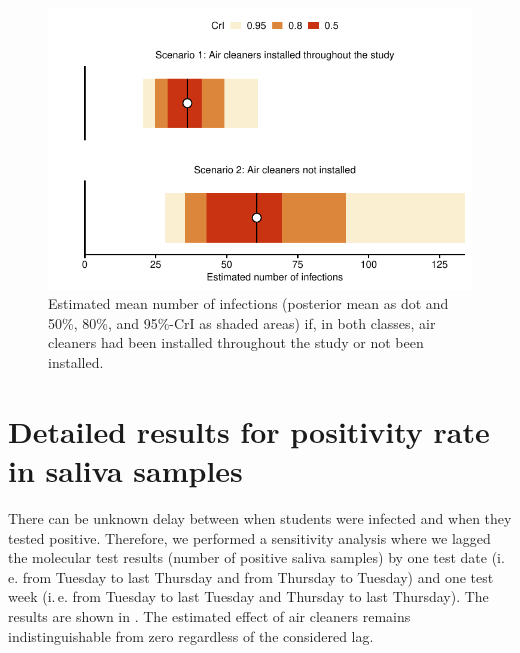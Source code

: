 \documentclass[fleqn,11pt]{wlscirep_supp}
\newcommand\ie{i.\,e.\xspace}
\begin{document}
\begin{figure}[!htpb]
    \includegraphics{../../results/epi-data/avoided-infections.pdf}
    \caption[Estimated number of infections with and without air cleaners]{Estimated mean number of infections (posterior mean as dot and 50\%, 80\%, and 95\%-CrI as shaded areas) if, in both classes, air cleaners had been installed throughout the study or not been installed.}
    \label{fig:avoided-infections}
\end{figure}

\clearpage

\section{Detailed results for positivity rate in saliva samples}
\label{sec:detailed-molecular}

There can be unknown delay between when students were infected and when they tested positive. Therefore, we performed a sensitivity analysis where we lagged the molecular test results (number of positive saliva samples) by one test date (\ie from Tuesday to last Thursday and from Thursday to Tuesday) and one test week (\ie from Tuesday to last Tuesday and Thursday to last Thursday). The results are shown in . The estimated effect of air cleaners remains indistinguishable from zero regardless of the considered lag.  
\end{document}
